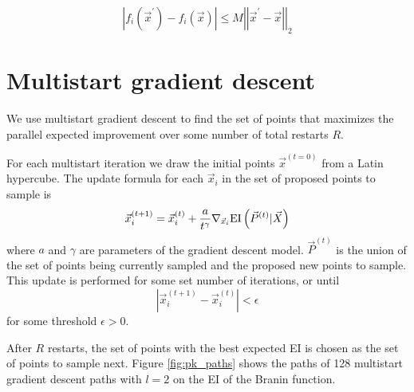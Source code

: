 \documentclass[phd,tocprelim]{cornell}
\begin{document}
\begin{equation}
    \left|f_{i}(\vec{x}^{\prime}) - f_{i}(\vec{x})\right| \leq M \left| \left| \vec{x}^{\prime} - \vec{x}\right|\right|_{2}
\end{equation}

\section{Multistart gradient descent}
\label{sec:multistart}

We use multistart gradient descent to find the set of points that maximizes the parallel expected improvement over some number of total restarts $R$.

For each multistart iteration we draw the initial points $\vec{x}^{(t=0)}$ from a Latin hypercube. The update formula for each $\vec{x}_{i}$ in the set of proposed points to sample is
\begin{equation}
    \vec{x}_{i}^{(t+1)} = \vec{x}_{i}^{(t)} + \frac{a}{t^{\gamma}} \nabla_{\vec{x}_{i}} {\rm EI}\left(\vec{P}^{(t)} | \vec{X}\right)
\end{equation}
where $a$ and $\gamma$ are parameters of the gradient descent model. $\vec{P}^{(t)}$ is the union of the set of points being currently sampled and the proposed new points to sample. This update is performed for some set number of iterations, or until
\begin{equation}
    \left|\vec{x}_{i}^{(t+1)} - \vec{x}_{i}^{(t)}\right| < \epsilon
\end{equation}
for some threshold $\epsilon > 0$.

After $R$ restarts, the set of points with the best expected EI is chosen as the set of points to sample next. Figure \ref{fig:pk_paths} shows the paths of 128 multistart gradient descent paths with $l = 2$ on the EI of the Branin function.
\end{document}
